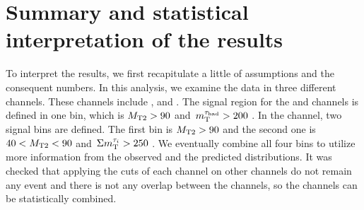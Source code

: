 \section{Summary and statistical interpretation of the results}
\label{sect:stat}

To interpret the results, we first recapitulate a little of assumptions and the consequent numbers.
In this analysis, we examine the data in three different channels.
These channels include \tauTau, \muTau and \eTau.
The signal region for the \muTau and \eTau channels is defined in one bin, which is ${M_{\rm T2}} > 90$ \GeV and $\,m_{\rm T}^{\tau_{\rm had}} > 200$ \GeV.
In the \tauTau channel, two signal bins are defined.
The first bin is ${M_{\rm T2}} > 90$ \GeV and the second one is $40 < {M_{\rm T2}} < 90$ \GeV and $\,\Sigma m_{\rm T}^{\tau_i} > 250$ \GeV.
We eventually combine all four bins to utilize more information from the observed and the predicted distributions.
It was checked that applying the cuts of each channel on other channels do not remain any event and 
there is not any overlap between the channels, so the channels can be statistically combined.


